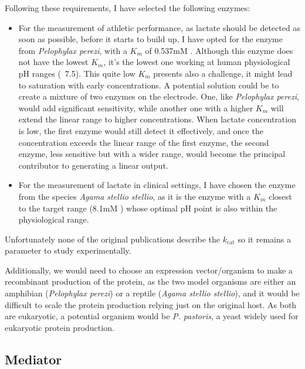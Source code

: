 \documentclass[conference]{IEEEtran}
\begin{document}
   Following these requirements, I have selected the following enzymes:
   \begin{itemize}
      \item For the measurement of athletic performance, as lactate should be detected as soon as possible, before it starts to build up,
       I have opted for the enzyme from \textit{Pelophylax perezi}, with a \(K_m\) of 0.537mM 
      \cite{mendiolaEffectsTemperaturePH1991}. Although this enzyme does not 
      have the lowest \(K_m\), it's the lowest one working at human 
      physiological pH ranges (~7.5). This quite low \(K_m\) presents also a challenge, it might lead to saturation with early concentrations. A potential 
      solution could be to create a mixture of two enzymes on the electrode. 
      One, like \textit{Pelophylax perezi}, would add significant sensitivity, while 
      another one with a higher \(K_m\) will extend the linear range to higher concentrations. When lactate 
      concentration is low, the first enzyme would still detect it effectively, 
      and once the concentration exceeds the linear range of the first enzyme, 
      the second enzyme, less sensitive but with a wider range, would become 
      the principal contributor to generating a linear output.
      
     
     \item For the measurement of lactate in clinical settings, I have chosen the 
     enzyme from the species \textit{Agama stellio stellio}, as it is the enzyme with a 
     \(K_m\) closest to the target range (8.1mM \cite{al-jassabiPurificationKineticProperties2002}) whose optimal pH point is also within 
     the physiological range.
   \end{itemize}

   Unfortunately none of the original publications describe the \(k_{\text{cat}}\) so it remains a parameter to study experimentally.

   Additionally, we would need to choose an expression vector/organism to make a recombinant
production of the protein, as the two model organisms are either an amphibian (\textit{Pelophylax perezi})
or a reptile (\textit{Agama stellio stellio}), and it would be difficult to scale the protein
production relying just on the original host. As both are eukaryotic, a potential organism
would be \textit{P. pastoris}, a yeast widely used for eukaryotic protein production.



\subsection{Mediator}
\end{document}
